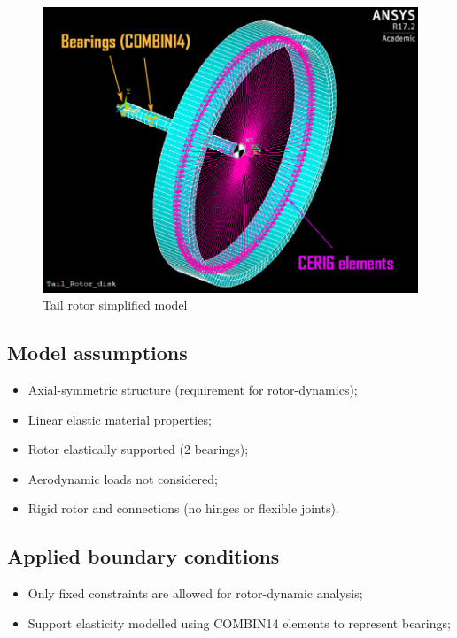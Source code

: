 \medskip
\begin{figure}[h]
	\begin{center}
		\centering  		 		
		\includegraphics[width=0.9\linewidth]{PICTURES/5_Rotordynamics/2.png}
	\end{center}
	\caption {Tail rotor simplified model}
\end{figure}

\subsection*{Model assumptions}
\begin{itemize}
	\item Axial-symmetric structure (requirement for rotor-dynamics);
	\item Linear elastic material properties;
	\item Rotor elastically supported (2 bearings);
	\item Aerodynamic loads not considered;
	\item Rigid rotor and connections (no hinges or flexible joints).
\end{itemize}



\subsection*{Applied boundary conditions}
\noindent
\begin{itemize}
	\item Only fixed constraints are allowed for rotor-dynamic analysis;
	\item Support elasticity modelled using COMBIN14 elements to represent bearings;
\end{itemize}

